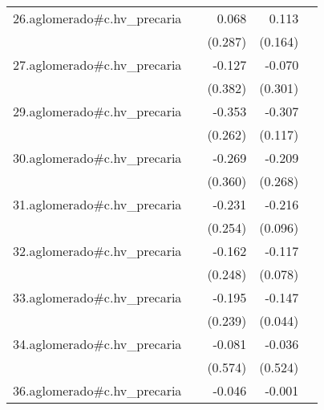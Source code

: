{\begin{longtable}{l*{4}{D{.}{.}{-1}}}
\addlinespace
26.aglomerado#c.hv\_precaria&                     &       0.068         &       0.113         &                     \\
            &                     &     (0.287)         &     (0.164)         &                     \\
\addlinespace
27.aglomerado#c.hv\_precaria&                     &      -0.127         &      -0.070         &                     \\
            &                     &     (0.382)         &     (0.301)         &                     \\
\addlinespace
29.aglomerado#c.hv\_precaria&                     &      -0.353         &      -0.307\sym{**} &                     \\
            &                     &     (0.262)         &     (0.117)         &                     \\
\addlinespace
30.aglomerado#c.hv\_precaria&                     &      -0.269         &      -0.209         &                     \\
            &                     &     (0.360)         &     (0.268)         &                     \\
\addlinespace
31.aglomerado#c.hv\_precaria&                     &      -0.231         &      -0.216\sym{*}  &                     \\
            &                     &     (0.254)         &     (0.096)         &                     \\
\addlinespace
32.aglomerado#c.hv\_precaria&                     &      -0.162         &      -0.117         &                     \\
            &                     &     (0.248)         &     (0.078)         &                     \\
\addlinespace
33.aglomerado#c.hv\_precaria&                     &      -0.195         &      -0.147\sym{***}&                     \\
            &                     &     (0.239)         &     (0.044)         &                     \\
\addlinespace
34.aglomerado#c.hv\_precaria&                     &      -0.081         &      -0.036         &                     \\
            &                     &     (0.574)         &     (0.524)         &                     \\
\addlinespace
36.aglomerado#c.hv\_precaria&                     &      -0.046         &      -0.001         &                     \\

\end{longtable}}
